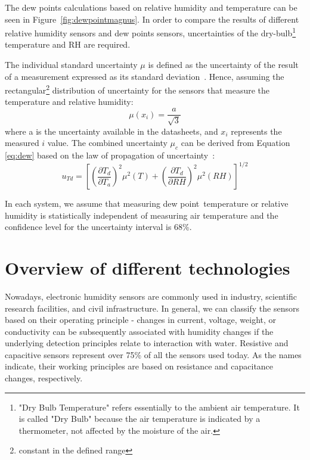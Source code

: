 The dew points calculations based on relative humidity and temperature can be seen in Figure~\ref{fig:dewpointmagnus}. In order to compare the results of different relative humidity sensors and dew points sensors, uncertainties of the dry-bulb\footnote{"Dry Bulb Temperature" refers essentially to the ambient air temperature. It is called "Dry Bulb" because the air temperature is indicated by a thermometer, not affected by the moisture of the air.} temperature and \gls{RH} are required.

The individual standard uncertainty $\mu$ is defined as the uncertainty of the result of a measurement expressed as its standard deviation~\cite{NIST_1994}. Hence, assuming the rectangular\footnote{constant in the defined range} distribution of uncertainty for the sensors that measure the temperature and relative humidity:
\begin{equation}
    \mu(x_{i}) = \frac{a}{\sqrt{3}}
\end{equation}
where a is the uncertainty available in the datasheets, and $x_{i}$ represents the measured $i$ value. The combined uncertainty $\mu_{c}$ can be derived from Equation \ref{eq:dew} based on the law of propagation of uncertainty~\cite{dp_uncertainty}:
\begin{equation}
    u_{Td} = \left [  \left (\frac{\partial T_{d}}{\partial T_{a}}  \right )^{2} \mu^{2}(T) + \left (\frac{\partial T_{d}}{\partial RH}  \right )^{2} \mu^{2}(RH)\right ]^{1/2}
    \label{dp_error}
\end{equation}

In each system, we assume that measuring dew point temperature or relative humidity is statistically independent of measuring air temperature and the confidence level for the uncertainty interval is 68\%.  

\section{Overview of different technologies}

Nowadays, electronic humidity sensors are commonly used in industry, scientific research facilities, and civil infrastructure. In general, we can classify the sensors based on their operating principle - changes in current, voltage, weight, or conductivity can be subsequently associated with humidity changes if the underlying detection principles relate to interaction with water. Resistive and capacitive sensors represent over 75\% of all the sensors used today. As the names indicate, their working principles are based on resistance and capacitance changes, respectively.


